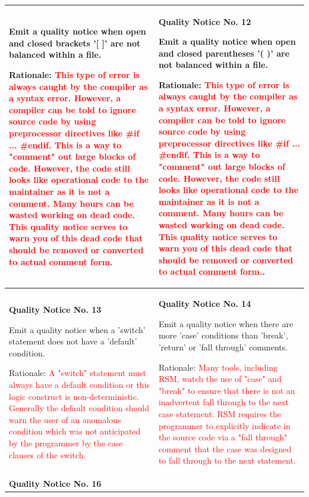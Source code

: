 {\begin{longtable}{||p{}|p{}||}
Emit a quality notice when open and closed brackets '[ ]' are not balanced within a file.

Rationale:  \textcolor{red}{This type of error is always caught by the compiler as a syntax error.  However, a compiler can be told to ignore source code by using preprocessor directives like \#if ... \#endif.  This is a way to "comment" out large blocks of code.  However, the code still looks like operational code to the maintainer as it is not a comment.  Many hours can be wasted working on dead code.  This quality notice serves to warn you of this dead code that should be removed or converted to actual comment form.}
 & \textbf{Quality Notice No. 12}
 
Emit a quality notice when open and closed parentheses '( )' are not balanced within a file.

Rationale:  \textcolor{red}{This type of error is always caught by the compiler as a syntax error.  However, a compiler can be told to ignore source code by using preprocessor directives like \#if ... \#endif.  This is a way to "comment" out large blocks of code.  However, the code still looks like operational code to the maintainer as it is not a comment.  Many hours can be wasted working on dead code.  This quality notice serves to warn you of this dead code that should be removed or converted to actual comment form.}.
    \\
    \hline \textbf{Quality Notice No. 13}
    
Emit a quality notice when a 'switch' statement does not have a 'default' condition.

Rationale:  \textcolor{red}{A "switch" statement must always have a default condition or this logic construct is non-deterministic.  Generally the default condition should warn the user of an anomalous condition which was not anticipated by the programmer by the case clauses of the switch.}
 & \textbf{Quality Notice No. 14}
 
Emit a quality notice when there are more 'case' conditions than 'break', 'return' or 'fall through' comments.

Rationale:  \textcolor{red}{Many tools, including RSM, watch the use of "case" and "break" to ensure that there is not an inadvertent fall through to the next case statement.  RSM requires the programmer to explicitly indicate in the source code via a "fall through" comment that the case was designed to fall through to the next statement.}
    \\
    \hline \textbf{Quality Notice No. 16}
    

\end{longtable}}
